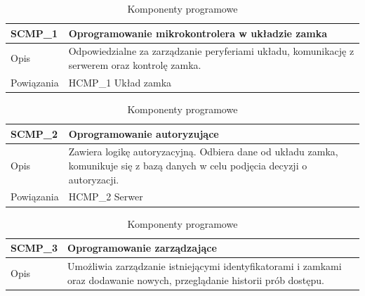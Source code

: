                 \begin{table}
                    \caption{Komponenty programowe}
                    \centering
                    \begin{subtable}[c]{\textwidth}
                        \centering
                        \begin{tabular}{p{2cm}|p{12cm}}
                            SCMP\_1      & \textbf{Oprogramowanie mikrokontrolera w układzie zamka} \\
                            \hline Opis         & Odpowiedzialne za zarządzanie peryferiami układu, komunikację z serwerem oraz kontrolę zamka.  \\
                            \hline Powiązania   & HCMP\_1 Układ zamka    \\
                        \end{tabular}
                        \label{tbl:scmp1}
                        \vspace{10mm}           
                    \end{subtable}
                \quad%
                    \begin{subtable}[c]{\textwidth}
                        \centering
                        \begin{tabular}{p{2cm}|p{12cm}}
                            SCMP\_2      & \textbf{Oprogramowanie autoryzujące} \\
                            \hline Opis         & Zawiera logikę autoryzacyjną. Odbiera dane od układu zamka, komunikuje się z bazą danych w celu podjęcia decyzji o autoryzacji. \\
                            \hline Powiązania   & HCMP\_2 Serwer    \\
                        \end{tabular}
                        \label{tbl:scmp2}
                        \vspace{10mm}           
                    \end{subtable}
                \quad%
                    \begin{subtable}[c]{\textwidth}
                        \centering
                        \begin{tabular}{p{2cm}|p{12cm}}
                            SCMP\_3      & \textbf{Oprogramowanie zarządzające} \\
                            \hline Opis         & Umożliwia zarządzanie istniejącymi identyfikatorami i zamkami oraz dodawanie nowych, przeglądanie historii prób dostępu. \\

\end{tabular}
\end{subtable}
\end{table}
